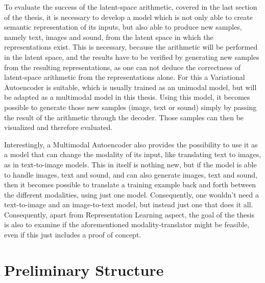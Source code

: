 To evaluate the success of the latent-space arithmetic, covered in the last section of the thesis, it is necessary
to develop a model which is not only able to create semantic representation of its inputs, but also able to
produce new samples, namely text, images and sound, from the latent space in which the representations exist.
This is necessary, because the arithmetic will be performed in the latent space, and the results 
have to be verified by generating new samples from the resulting representations, as one can not deduce
the correctness of latent-space arithmetic from the representations alone.
For this a Variational Autoencoder is suitable, which is usually trained as an unimodal model, but will be
adapted as a multimodal model in this thesis.
Using this model, it becomes possible to generate those new samples (image, text or sound) simply by passing the result of the arithmetic
through the decoder. Those samples can then be visualized and therefore evaluated.

Interestingly, a Multimodal Autoencoder also provides the possibility to use it as a model
that can change the modality of its input, like translating text to images, as in text-to-image models.
This in itself is nothing new, but if the model is able to handle images, text and sound, and can also
generate images, text and sound, then it becomes possible to translate a training example
back and forth between the different modalities, using just one model. Consequently, one wouldn't need
a text-to-image and an image-to-text model, but instead just one that does it all.
Consequently, apart from Representation Learning aspect, the goal of the thesis is also to examine if the aforementioned 
modality-translator might be feasible, even if this just includes a proof of concept.

\chapter{Preliminary Structure}

